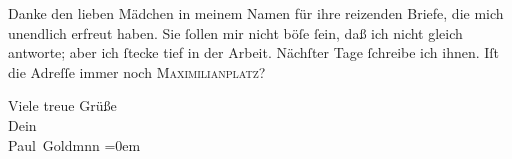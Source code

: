 \pstart
           Danke den lieben Mädchen in meinem Namen für ihre reizenden Briefe, die mich unendlich
               erfreut haben. Sie{ }ſollen mir nicht böſe{ }ſein, daß ich nicht gleich antworte; aber
               ich{ }ſtecke tief in der Arbeit. Nächſter Tage{ }ſchreibe ich ihnen. Iſt die Adreſſe
               immer noch \textsc{Maximilianplatz}?\pend
           
\pstart
           Viele treue Grüße {\\[\baselineskip]}Dein {\\[\baselineskip]}\spacefill\mbox{Paul Goldmnn}\pend
           \leftskip=0em{}
\pstart

